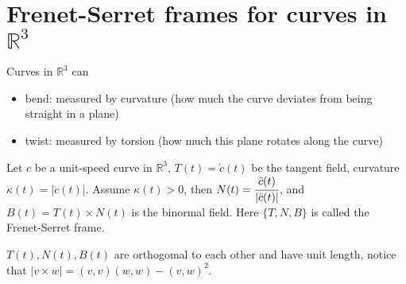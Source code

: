 \documentclass[10pt]{article}
\begin{document}
            

        \section{Frenet-Serret frames for curves in $\mathbb{R}^3$}
            Curves in $\mathbb{R}^3$ can
            \begin{itemize}
                \item bend: measured by curvature (how much the curve deviates from being straight in a plane)
                \item twist: measured by torsion (how much this plane rotates along the curve)
            \end{itemize}

            \begin{definition}
                Let $c$ be a unit-speed curve in $\mathbb{R}^3$, $T(t) = \dot{c}(t)$ be the tangent field, curvature $\kappa(t) = |\ddot{c}(t)|$. Assume $\kappa(t)>0$, then $N(t) = \cfrac{\ddot{c}(t)}{|\ddot{c}(t)|}$, and $B(t) = T(t)\times N(t)$ is the binormal field. Here $\{T,N,B\}$ is called the Frenet-Serret frame.
            \end{definition}
            \begin{remark}
                $T(t), N(t), B(t)$ are orthogomal to each other and have unit length, notice that $|v\times w| = (v,v)(w,w) - (v,w)^2$.
            \end{remark}
\end{document}
